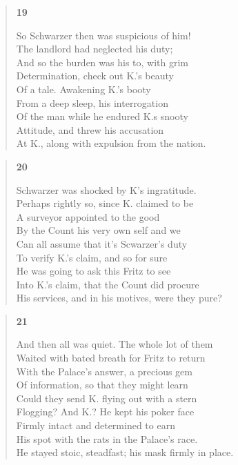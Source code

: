 \documentclass{article}
\begin{document}
\begin{verse}
  \begin{center}
    \textbf{19} \\
  \end{center}
  So Schwarzer then was suspicious of him! \\
  The landlord had neglected his duty; \\
  And so the burden was his to, with grim \\
  Determination, check out K.'s beauty \\
  Of a tale. Awakening K.'s booty \\
  From a deep sleep, his interrogation \\
  Of the man while he endured K.s snooty \\
  Attitude, and threw his accusation \\
  At K., along with expulsion from the nation.

\end{verse}

\newpage

\begin{verse}
  \begin{center}
    \textbf{20} \\
  \end{center}
  Schwarzer was shocked by K's ingratitude. \\
  Perhaps rightly so, since K. claimed to be \\
  A surveyor appointed to the good \\
  By the Count his very own self and we \\
  Can all assume that it's Scwarzer's duty \\
  To verify K.'s claim, and so for sure \\
  He was going to ask this Fritz to see \\
  Into K.'s claim, that the Count did procure \\
  His services, and in his motives, were they pure?
\end{verse}

\begin{verse}
  \begin{center}
    \textbf{21} \\
  \end{center}
  And then all was quiet. The whole lot of them \\
  Waited with bated breath for Fritz to return \\
  With the Palace's answer, a precious gem \\
  Of information, so that they might learn \\
  Could they send K. flying out with a stern \\
  Flogging? And K.? He kept his poker face \\
  Firmly intact and determined to earn \\
  His spot with the rats in the Palace's race. \\
  He stayed stoic, steadfast; his mask firmly in place.
\end{verse}
\end{document}
